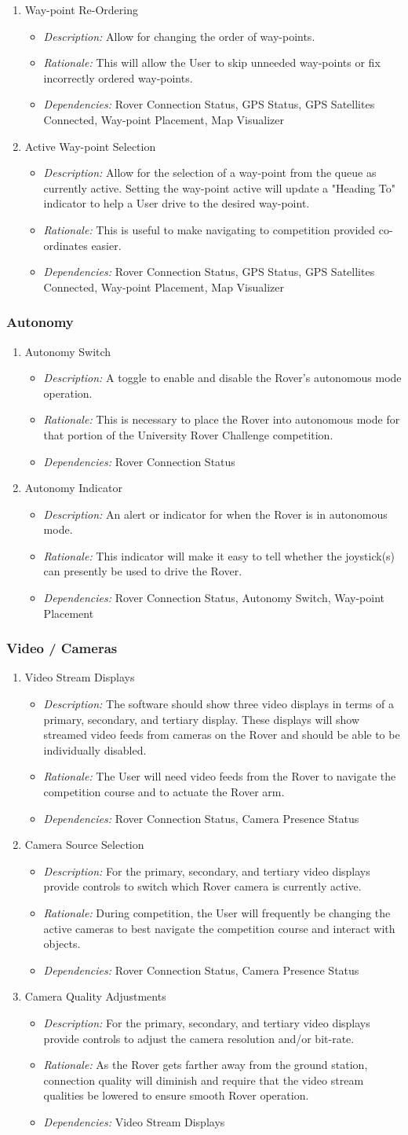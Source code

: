 \documentclass[onecolumn, draftclsnofoot, 10pt, compsoc]{IEEEtran}
\newcommand{\functRequ}[4]{
\item #1%
\par
\begin{itemize}
\item \textit{Description:} #2.%
\item \textit{Rationale:} #3.%
\item \textit{Dependencies:} #4%
\end{itemize}
}
\begin{document}
\begin{enumerate}
\functRequ{Way-point Re-Ordering}
{Allow for changing the order of way-points}
{This will allow the User to skip unneeded way-points or fix incorrectly ordered way-points}
{Rover Connection Status, GPS Status, GPS Satellites Connected, Way-point Placement, Map Visualizer}

\functRequ{Active Way-point Selection}
{Allow for the selection of a way-point from the queue as currently active.
Setting the way-point active will update a "Heading To" indicator to help a User drive to the desired way-point}
{This is useful to make navigating to competition provided co-ordinates easier}
{Rover Connection Status, GPS Status, GPS Satellites Connected, Way-point Placement, Map Visualizer}

\end{enumerate}
\subsubsection{Autonomy}
\begin{enumerate}
\functRequ{Autonomy Switch}
{A toggle to enable and disable the Rover's autonomous mode operation}
{This is necessary to place the Rover into autonomous mode for that portion of the University Rover Challenge competition}
{Rover Connection Status}

\functRequ{Autonomy Indicator}
{An alert or indicator for when the Rover is in autonomous mode}
{This indicator will make it easy to tell whether the joystick(s) can presently be used to drive the Rover}
{Rover Connection Status, Autonomy Switch, Way-point Placement}
\end{enumerate}


\subsubsection{Video / Cameras}
\begin{enumerate}
\functRequ{Video Stream Displays}
{The software should show three video displays in terms of a primary, secondary, and tertiary display.
These displays will show streamed video feeds from cameras on the Rover and should be able to be individually disabled}
{The User will need video feeds from the Rover to navigate the competition course and to actuate the Rover arm}
{Rover Connection Status, Camera Presence Status}


\functRequ{Camera Source Selection}
{For the primary, secondary, and tertiary video displays provide controls to switch which Rover camera is currently active}
{During competition, the User will frequently be changing the active cameras to best navigate the competition course and interact with objects}
{Rover Connection Status, Camera Presence Status}

\functRequ{Camera Quality Adjustments}
{For the primary, secondary, and tertiary video displays provide controls to adjust the camera resolution and/or bit-rate}
{As the Rover gets farther away from the ground station, connection quality will diminish and require that the video stream qualities be lowered to ensure smooth Rover operation}
{Video Stream Displays}
\end{enumerate}
\end{document}
